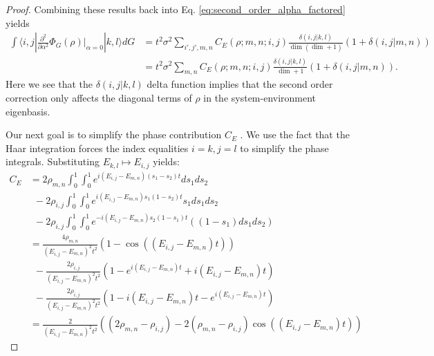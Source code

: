 \documentclass{article}
\newcommand{\ket}[1]{|#1\rangle}
\newcommand{\bra}[1]{\langle #1|}
\newcommand{\parens}[1]{\left( #1 \right)}
\begin{document}
\begin{proof}
Combining these results back into Eq. \eqref{eq:second_order_alpha_factored} yields
\begin{align}
    \int \bra{i,j} \frac{\partial^2}{\partial \alpha^2} \Phi_G(\rho) \bigg|_{\alpha = 0} \ket{k,l} dG &= t^2 \sigma^2 \sum_{i',j',m,n} C_E(\rho; m,n; i,j) \frac{\delta(i, j | k,l)}{\dim (\dim + 1)} (1 + \delta(i,j | m,n)) \\
    &= t^2 \sigma^2 \sum_{m,n} C_E(\rho; m,n; i,j) \frac{\delta(i, j | k,l)}{\dim + 1
    } (1 + \delta(i,j | m,n)).
\end{align}
Here we see that the $\delta(i,j | k,l)$ delta function implies that the second order correction only affects the diagonal terms of $\rho$ in the system-environment eigenbasis.

Our next goal is to simplify the phase contribution $C_E$ . We use the fact that the Haar integration forces the index equalities $i = k, j = l$ to simplify the phase integrals. Substituting $E_{k,l} \mapsto E_{i,j}$ yields:
\begin{align}
    C_E &= 2 \rho_{m,n} \int_0^1 \int_0^1 e^{i(E_{i,j} - E_{m,n})(s_1 - s_2)t} ds_1 ds_2 \nonumber \\
    &~ ~ - 2 \rho_{i,j} \int_0^1 \int_0^1 e^{i (E_{i,j} - E_{m,n})s_1 (1- s_2)t}s_1 ds_1 ds_2 \nonumber \\
    &~ ~ - 2 \rho_{i,j} \int_0^1 \int_0^1 e^{-i(E_{i,j} - E_{m,n})s_2(1-s_1)t}((1-s_1)ds_1 ds_2) \label{eq:phase_int_equal_energy} \\
    &= \frac{4 \rho_{m,n}}{(E_{i,j} - E_{m,n})^2 t^2} (1 - \cos((E_{i,j} - E_{m,n})t)) \nonumber \\
    &~ ~ - \frac{2 \rho_{i,j}}{(E_{i,j} - E_{m,n})^2 t^2} \parens{1 - e^{i (E_{i,j} - E_{m,n})t} + i (E_{i,j} - E_{m,n})t } \nonumber \\
    & ~ ~ - \frac{2 \rho_{i,j}}{(E_{i,j} - E_{m,n})^2 t^2} \parens{1 - i (E_{i,j} - E_{m,n})t - e^{i(E_{i,j} - E_{m,n})t}} \\
    &= \frac{2}{(E_{i,j} - E_{m,n})^2 t^2} \parens{(2 \rho_{m,n} - \rho_{i,j}) - 2(\rho_{m,n} - \rho_{i,j}) \cos ((E_{i,j} - E_{m,n})t)}
\end{align}


\end{proof}
\end{document}
